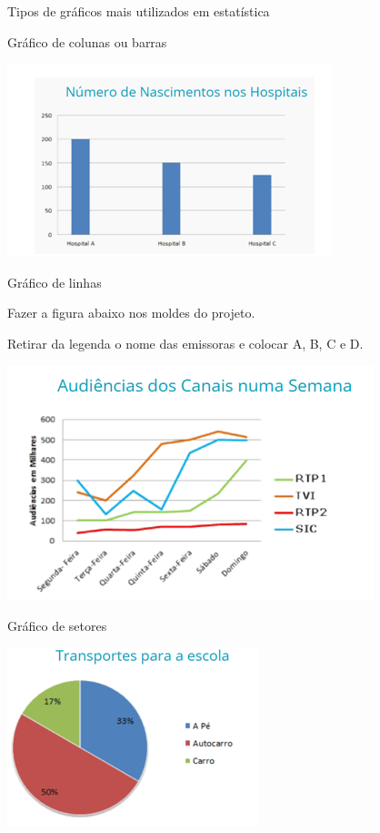 Tipos de gráficos mais utilizados em estatística

Gráfico de colunas ou barras

\includegraphics[width=3.71875in,height=2.20833in]{./imgSAEB_6_MAT/media/image77.png}

Gráfico de linhas

Fazer a figura abaixo nos moldes do projeto.

Retirar da legenda o nome das emissoras e colocar A, B, C e D.

\includegraphics[width=4.1875in,height=2.6875in]{./imgSAEB_6_MAT/media/image79.png}

Gráfico de setores

\includegraphics[width=2.88542in,height=2.03125in]{./imgSAEB_6_MAT/media/image80.png}


